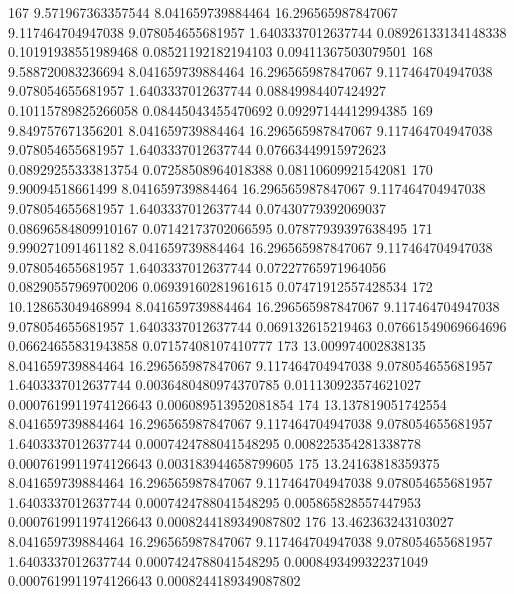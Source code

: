 {167 9.571967363357544 8.041659739884464 16.296565987847067 9.117464704947038 9.078054655681957 1.6403337012637744 0.08926133134148338 0.10191938551989468 0.08521192182194103 0.09411367503079501
168 9.588720083236694 8.041659739884464 16.296565987847067 9.117464704947038 9.078054655681957 1.6403337012637744 0.08849984407424927 0.10115789825266058 0.08445043455470692 0.09297144412994385
169 9.849757671356201 8.041659739884464 16.296565987847067 9.117464704947038 9.078054655681957 1.6403337012637744 0.07663449915972623 0.08929255333813754 0.07258508964018388 0.08110609921542081
170 9.90094518661499 8.041659739884464 16.296565987847067 9.117464704947038 9.078054655681957 1.6403337012637744 0.07430779392069037 0.08696584809910167 0.07142173702066595 0.07877939397638495
171 9.990271091461182 8.041659739884464 16.296565987847067 9.117464704947038 9.078054655681957 1.6403337012637744 0.07227765971964056 0.08290557969700206 0.06939160281961615 0.07471912557428534
172 10.128653049468994 8.041659739884464 16.296565987847067 9.117464704947038 9.078054655681957 1.6403337012637744 0.069132615219463 0.07661549069664696 0.06624655831943858 0.07157408107410777
173 13.009974002838135 8.041659739884464 16.296565987847067 9.117464704947038 9.078054655681957 1.6403337012637744 0.0036480480974370785 0.011130923574621027 0.0007619911974126643 0.006089513952081854
174 13.137819051742554 8.041659739884464 16.296565987847067 9.117464704947038 9.078054655681957 1.6403337012637744 0.0007424788041548295 0.008225354281338778 0.0007619911974126643 0.003183944658799605
175 13.24163818359375 8.041659739884464 16.296565987847067 9.117464704947038 9.078054655681957 1.6403337012637744 0.0007424788041548295 0.005865828557447953 0.0007619911974126643 0.0008244189349087802
176 13.462363243103027 8.041659739884464 16.296565987847067 9.117464704947038 9.078054655681957 1.6403337012637744 0.0007424788041548295 0.0008493499322371049 0.0007619911974126643 0.0008244189349087802
}\tableexpivwaitskltweet
